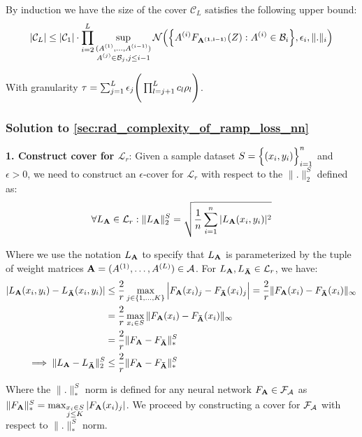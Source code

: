 \begin{proof*}
    \noindent By induction we have the size of the cover $\mathcal{C}_L$ satisfies the following upper bound:
    \begin{align*}
        |\mathcal{C}_L| \le |\mathcal{C}_1|\cdot\prod_{i=2}^L\sup_{
            \substack{
                (A^{(1)}, \dots, A^{(i-1)})\\
                A^{(j)}\in\mathcal{B}_j, j\le i-1
            }
        }\mathcal{N}\Big( 
            \Big\{ 
                A^{(i)}F_{\bf A^{(1, i-1)}}(Z) : A^{(i)}\in\mathcal{B}_i
             \Big\}, \epsilon_i, \|.\|_i
         \Big)
    \end{align*}

    \noindent With granularity $\tau=\sum_{j=1}^L\epsilon_j\Bigg( \prod_{l=j+1}^L c_l\rho_l \Bigg)$.
\end{proof*}


\subsubsection{Solution to \ref{sec:rad_complexity_of_ramp_loss_nn}}
\textbf{1. Construct cover for $\mathcal{L}_r$}: Given a sample dataset $S=\Big\{ (x_i, y_i) \Big\}_{i=1}^n$ and $\epsilon>0$, we need to construct an $\epsilon$-cover for $\mathcal{L}_r$ with respect to the $\|.\|_2^S$ defined as:
\begin{align*}
    \forall L_{\bf A} \in \mathcal{L}_r : \|L_{\bf A}\|_2^S = \sqrt{
        \frac{1}{n}\sum_{i=1}^n |L_{\bf A}(x_i, y_i)|^2
    }
\end{align*}

\noindent Where we use the notation $L_{\bf A}$ to specify that $L_{\bf A}$ is parameterized by the tuple of weight matrices ${\bf A}=(A^{(1)}, \dots, A^{(L)})\in\mathcal{A}$. For $L_{\bf A},L_{\bf \bar A}\in\mathcal{L}_r$, we have:
\begin{align*}
    |L_{\bf A}(x_i, y_i) - L_{\bf \bar A}(x_i, y_i)| &\le \frac{2}{r}\max_{j\in\{1, \dots, K\}} \Big| 
        F_{\bf A}(x_i)_j - F_{\bf \bar A}(x_i)_j
     \Big| = \frac{2}{r}\|F_{\bf A}(x_i) - F_{\bf \bar A}(x_i)\|_\infty \\
    &= \frac{2}{r}\max_{x_i \in S} \|F_{\bf A}(x_i) - F_{\bf \bar A}(x_i)\|_\infty \\
    &= \frac{2}{r} \|F_{\bf A} - F_{\bf \bar A}\|_*^S\\
    \implies 
    \|L_{\bf A} - L_{\bf \bar A}\|_2^S &\le \frac{2}{r}\|F_{\bf A} - F_{\bf \bar A}\|_*^S
\end{align*}

\noindent Where the $\|.\|_*^S$ norm is defined for any neural network $F_{\bf A}\in\mathcal{F}_\mathcal{A}$ as $\|F_{\bf A}\|_*^S = \max_{\substack{x_i\in S \\ j \le K}} |F_{\bf A}(x_i)_j|$. We proceed by constructing a cover for $\mathcal{F}_\mathcal{A}$ with respect to $\|.\|_*^S$ norm. 


